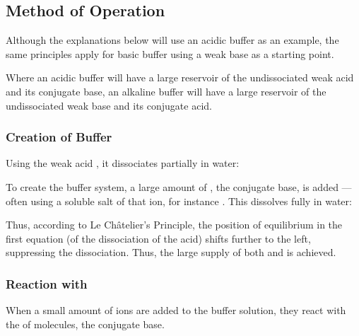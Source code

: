 		\subsection{Method of Operation}

			Although the explanations below will use an acidic buffer as an example, the same principles apply for basic buffer using a weak
			base as a starting point.

			Where an acidic buffer will have a large reservoir of the undissociated weak acid and its conjugate base, an alkaline buffer will
			have a large reservoir of the undissociated weak base and its conjugate acid.

			\pagebreak
			\subsubsection{Creation of Buffer}

				Using the weak acid , it dissociates partially in water:


				To create the buffer system, a large amount of , the conjugate base, is added --- often using a soluble salt of
				that ion, for instance . This dissolves fully in water:


				Thus, according to Le Châtelier's Principle, the position of equilibrium in the first equation (of the dissociation of the acid)
				shifts further to the left, suppressing the dissociation. Thus, the large supply of both  and  is
				achieved.



			\subsubsection{Reaction with \texorpdfstring{}{H⁺}}

				When a small amount of  ions are added to the buffer solution, they react with the  of
				 molecules, the conjugate base.

